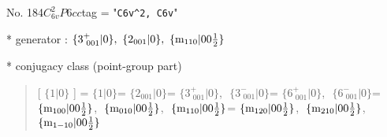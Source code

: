 \documentclass[fleqn,10pt,landscape]{jsarticle}
\begin{document}
\newpage

No. 184\quad$C_{6v}^{2}$\quad$P6cc$\quad[ hexagonal ]
tag = "{\tt C6v^2, C6v}"

* generator : $\{3^{+}_{\,\,001}|0\},\,\,\{2{}_{001}|0\},\,\,\{{\rm m}_{110}|0 0 \frac{1}{2}\}$

* conjugacy class (point-group part)
\begin{quote}
[ $\{1|0\}$ ] = \quad $\{1|0\}$\newline[ $\{2{}_{001}|0\}$ ] = \quad $\{2{}_{001}|0\}$\newline[ $\{3^{+}_{\,\,001}|0\}$ ] = \quad $\{3^{+}_{\,\,001}|0\}$,\,\, $\{3^{-}_{\,\,001}|0\}$\newline[ $\{6^{+}_{\,\,001}|0\}$ ] = \quad $\{6^{+}_{\,\,001}|0\}$,\,\, $\{6^{-}_{\,\,001}|0\}$\newline[ $\{{\rm m}_{100}|0 0 \frac{1}{2}\}$ ] = \quad $\{{\rm m}_{100}|0 0 \frac{1}{2}\}$,\,\, $\{{\rm m}_{010}|0 0 \frac{1}{2}\}$,\,\, $\{{\rm m}_{110}|0 0 \frac{1}{2}\}$\newline[ $\{{\rm m}_{120}|0 0 \frac{1}{2}\}$ ] = \quad $\{{\rm m}_{120}|0 0 \frac{1}{2}\}$,\,\, $\{{\rm m}_{210}|0 0 \frac{1}{2}\}$,\,\, $\{{\rm m}_{1-10}|0 0 \frac{1}{2}\}$\newline
\end{quote}
\end{document}
